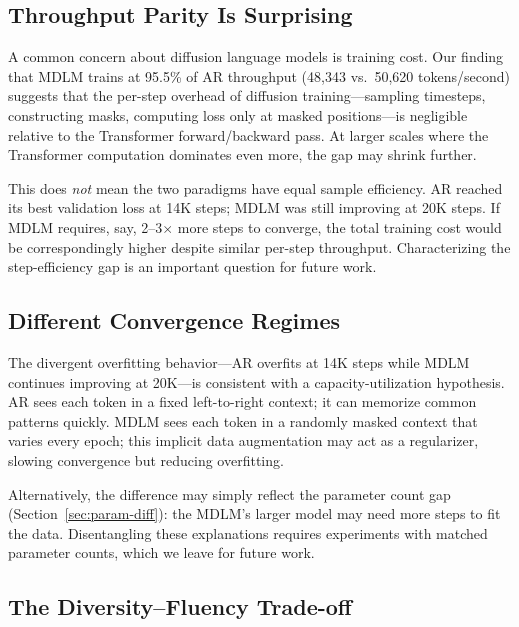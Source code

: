 \documentclass[11pt,a4paper]{article}
\begin{document}
\subsection{Throughput Parity Is Surprising}

A common concern about diffusion language models is training cost.
Our finding that MDLM trains at 95.5\% of AR throughput (48{,}343 vs.\ 50{,}620 tokens/second) suggests that the per-step overhead of diffusion training---sampling timesteps, constructing masks, computing loss only at masked positions---is negligible relative to the Transformer forward/backward pass.
At larger scales where the Transformer computation dominates even more, the gap may shrink further.

This does \emph{not} mean the two paradigms have equal sample efficiency.
AR reached its best validation loss at 14K steps; MDLM was still improving at 20K steps.
If MDLM requires, say, 2--3$\times$ more steps to converge, the total training cost would be correspondingly higher despite similar per-step throughput.
Characterizing the step-efficiency gap is an important question for future work.

\subsection{Different Convergence Regimes}

The divergent overfitting behavior---AR overfits at 14K steps while MDLM continues improving at 20K---is consistent with a capacity-utilization hypothesis.
AR sees each token in a fixed left-to-right context; it can memorize common patterns quickly.
MDLM sees each token in a randomly masked context that varies every epoch; this implicit data augmentation may act as a regularizer, slowing convergence but reducing overfitting.

Alternatively, the difference may simply reflect the parameter count gap (Section~\ref{sec:param-diff}): the MDLM's larger model may need more steps to fit the data.
Disentangling these explanations requires experiments with matched parameter counts, which we leave for future work.

\subsection{The Diversity--Fluency Trade-off}
\end{document}
